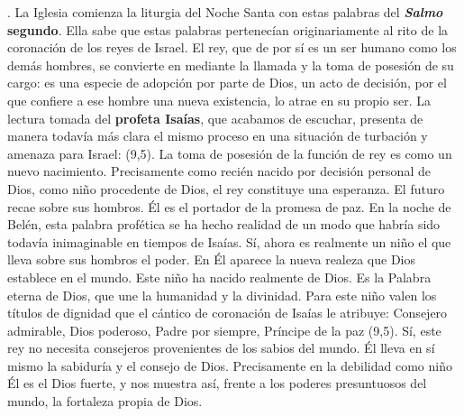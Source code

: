 \begin{body}
\begin{body}
. La Iglesia comienza la liturgia del Noche Santa con estas palabras del \textbf{\emph{Salmo} segundo}. Ella sabe que estas palabras pertenecían originariamente al rito de la coronación de los reyes de Israel. El rey, que de por sí es un ser humano como los demás hombres, se convierte en  mediante la llamada y la toma de posesión de su cargo: es una especie de adopción por parte de Dios, un acto de decisión, por el que confiere a ese hombre una nueva existencia, lo atrae en su propio ser. La lectura tomada del \textbf{profeta Isaías}, que acabamos de escuchar, presenta de manera todavía más clara el mismo proceso en una situación de turbación y amenaza para Israel:  (9,5). La toma de posesión de la función de rey es como un nuevo nacimiento. Precisamente como recién nacido por decisión personal de Dios, como niño procedente de Dios, el rey constituye una esperanza. El futuro recae sobre sus hombros. Él es el portador de la promesa de paz. En la noche de Belén, esta palabra profética se ha hecho realidad de un modo que habría sido todavía inimaginable en tiempos de Isaías. Sí, ahora es realmente un niño el que lleva sobre sus hombros el poder. En Él aparece la nueva realeza que Dios establece en el mundo. Este niño ha nacido realmente de Dios. Es la Palabra eterna de Dios, que une la humanidad y la divinidad. Para este niño valen los títulos de dignidad que el cántico de coronación de Isaías le atribuye: Consejero admirable, Dios poderoso, Padre por siempre, Príncipe de la paz (9,5). Sí, este rey no necesita consejeros provenientes de los sabios del mundo. Él lleva en sí mismo la sabiduría y el consejo de Dios. Precisamente en la debilidad como niño Él es el Dios fuerte, y nos muestra así, frente a los poderes presuntuosos del mundo, la fortaleza propia de Dios.


\end{body}
\end{body}
